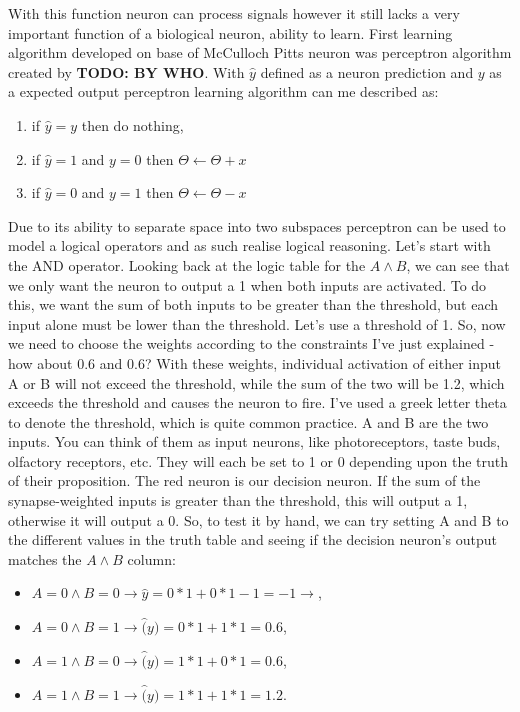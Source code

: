 With this function neuron can process signals however it still lacks a very important function
of a biological neuron, ability to learn. First learning algorithm developed on base of 
McCulloch Pitts neuron was perceptron algorithm created by \textbf{TODO: BY WHO}.
With $\hat{y}$ defined as a neuron prediction and $y$ as a expected output perceptron learning
algorithm can me described as:
\begin{enumerate}
	\item if $\hat{y}=y$ then do nothing,
	\item if $\hat{y}=1$ and $y=0$ then $\Theta \leftarrow \Theta + x$
	\item if $\hat{y}=0$ and $y=1$ then $\Theta \leftarrow \Theta - x$
\end{enumerate}
Due to its ability to separate space into two subspaces perceptron can be used to model a logical
operators and as such realise logical reasoning.
Let's start with the AND operator.  Looking back at the logic table for the $A\land B$, 
we can see that we only want the neuron to output a 1 when both inputs are activated.
To do this, we want the sum of both inputs to be greater than the threshold, but each input alone
must be lower than the threshold.  Let's use a threshold of 1. 
So, now we need to choose the weights according to the constraints I've just explained - 
how about 0.6 and 0.6?  With these weights, individual activation of either input A or B will 
not exceed the threshold, while the sum of the two will be 1.2, which exceeds the threshold 
and causes the neuron to fire.
I've used a greek letter theta to denote the threshold, which is quite common practice. 
A and B are the two inputs.  You can think of them as input neurons, like photoreceptors, 
taste buds, olfactory receptors, etc.  They will each be set to 1 or 0 depending upon the truth of
their proposition.  The red neuron is our decision neuron. 
If the sum of the synapse-weighted inputs is greater than the threshold, 
this will output a 1, otherwise it will output a 0.  
So, to test it by hand, we can try setting A and B to the different values in the 
truth table and seeing if the decision neuron's output matches the $A\land B$ column:
\begin{itemize}
	\item  $A=0 \land B=0  \to   \hat{y} = 0*1  +  0*1 - 1  = -1 \to$,
	\item $A=0 \land B=1  \to  \hat(y) = 0*1  +  1*1  = 0.6$,
	\item $A=1 \land B=0  \to  \hat(y) = 1*1  +  0*1  = 0.6$,
	\item $A=1 \land B=1  \to  \hat(y) = 1*1  +  1*1  = 1.2$.
\end{itemize}

